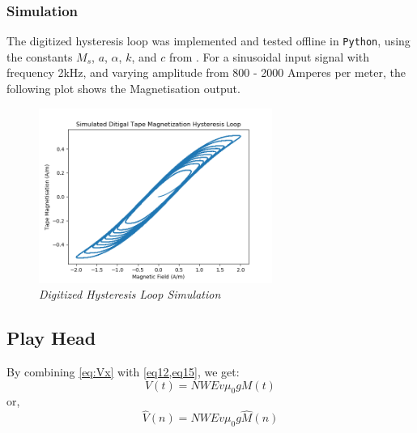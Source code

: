 \documentclass[twoside,a4paper]{article}
\begin{document}
\subsubsection{Simulation}
The digitized hysteresis loop was implemented and tested offline
in \texttt{Python}, using the constants $M_s$, $a$, $\alpha$, $k$,
and $c$ from \cite{JilesAtherton1986}. For a sinusoidal input signal
with frequency 2kHz, and varying amplitude from 800 - 2000 Amperes per
meter, the following plot shows the Magnetisation output.

\begin{figure}[ht]
    \center
    \includegraphics[width=3in]{../Simulations/Hysteresis/Sim2-M_H.png}
    \caption{\label{HysteresisSim}{\it Digitized Hysteresis Loop Simulation}}
\end{figure}
%
\subsection{Play Head}
By combining \cref{eq:Vx} with \cref{eq12,eq15}, we get:
\begin{equation}
    V(t) =  NWEv \mu_0  g M(t)
\end{equation}
%
or,
\begin{equation}
    \hat{V}(n) =  NWEv \mu_0  g \hat{M}(n)
    \label{eq:Vout}
\end{equation}
%
\end{document}
